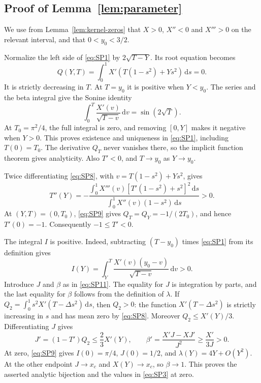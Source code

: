 \subsection{Proof of Lemma~\ref{lem:parameter}}\label{app:parameter-proof}

We use from Lemma~\ref{lem:kernel-zeros} that $X>0$,
$X''<0$ and $X'''>0$ on the relevant interval, and that $0<y_0<3/2$.

Normalize the left side of \eqref{eq:SP1} by \(2\sqrt{T-Y}\). Its root equation
becomes \begin{equation}
Q(Y,T)=\int_0^1X'(T(1-s^2)+Ys^2)\,\mathrm{d}s=0.
 \label{eq:SP8}
\end{equation} It is strictly decreasing in \(T\). At \(T=y_0\) it is positive when
\(Y<y_0\). The series and the beta integral give the Sonine identity \begin{equation}
\int_0^T\frac{X'(v)}{\sqrt{T-v}}\,\mathrm{d}v
       =\sin(2\sqrt T).
 \label{eq:SP9}
\end{equation} At \(T_0=\pi^2/4\), the full integral is zero, and removing \([0,Y]\)
makes it negative when \(Y>0\). This proves existence and uniqueness in
\eqref{eq:SP1}, including \(T(0)=T_0\). The derivative \(Q_T\) never vanishes
there, so the implicit function theorem gives analyticity. Also
\(T'<0\), and \(T\to y_0\) as \(Y\to y_0\).

Twice differentiating \eqref{eq:SP8}, with \(v=T(1-s^2)+Ys^2\), gives \[
 T''(Y)=
 -\frac{\int_0^1X'''(v)[T'(1-s^2)+s^2]^2\,\mathrm{d}s}
        {\int_0^1X''(v)(1-s^2)\,\mathrm{d}s}>0.
\] At \((Y,T)=(0,T_0)\), \eqref{eq:SP9} gives \(Q_T=Q_Y=-1/(2T_0)\), and hence
\(T'(0)=-1\). Consequently \(-1\le T'<0\).

The integral \(I\) is positive. Indeed, subtracting \((T-y_0)\) times
\eqref{eq:SP1} from its definition gives \begin{equation}
I(Y)=\int_Y^T
 \frac{X'(v)(y_0-v)}{\sqrt{T-v}}\,\mathrm{d}v>0.
 \label{eq:SP10}
\end{equation} Introduce \(J\) and \(\beta\) as in \eqref{eq:SP11}.
The equality for \(J\) is integration by parts, and the last equality
for \(\beta\) follows from the definition of \(\lambda\). If
\(Q_2=\int_0^1s^2X'(T-\Delta s^2)\,\mathrm{d}s\), then \(Q_2>0\): the function
\(X'(T-\Delta s^2)\) is strictly increasing in \(s\) and has mean zero
by \eqref{eq:SP8}. Moreover \(Q_2\le X'(Y)/3\). Differentiating \(J\) gives \begin{equation}
J'=(1-T')Q_2\le\frac23X'(Y),
 \qquad
 \beta'=\frac{X'J-XJ'}{J^2}\ge\frac{X'}{3J}>0.
 \label{eq:SP12}
\end{equation} At zero, \eqref{eq:SP9} gives \(I(0)=\pi/4\), \(J(0)=1/2\), and
\(\lambda(Y)=4Y+O(Y^2)\). At the other endpoint \(J\to x_c\) and
\(X(Y)\to x_c\), so \(\beta\to1\). This proves the asserted analytic
bijection and the values in \eqref{eq:SP3} at zero.


